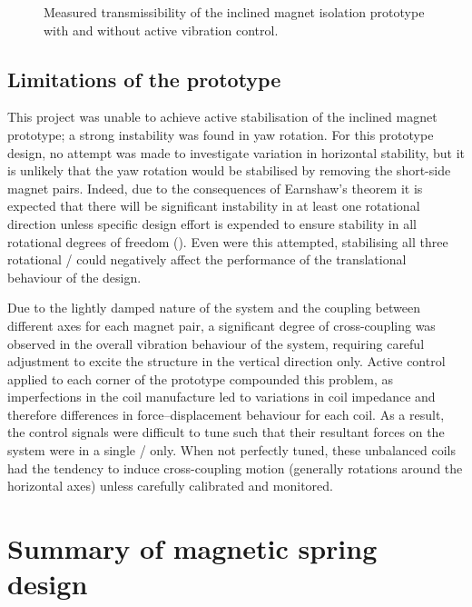 \documentclass[11pt,a4paper]{memoir}
\begin{document}
\begin{figure}
\caption{Measured transmissibility of the inclined magnet isolation prototype with and without active vibration control.}
\end{figure}

\subsection{Limitations of the prototype}

This project was unable to achieve active stabilisation of the inclined magnet prototype; a strong instability was found in yaw rotation.
For this prototype design, no attempt was made to investigate variation in horizontal stability, but it is unlikely that the yaw rotation would be stabilised by removing the short-side magnet pairs.
Indeed, due to the consequences of Earnshaw's theorem it is expected that there will be significant instability in at least one rotational direction unless specific design effort is expended to ensure stability in all rotational degrees of freedom ().
Even were this attempted, stabilising all three rotational \dofs/ could negatively affect the performance of the translational behaviour of the design.

Due to the lightly damped nature of the system and the coupling between different axes for each magnet pair, a significant degree of cross-coupling was observed in the overall vibration behaviour of the system, requiring careful adjustment to excite the structure in the vertical direction only.
Active control applied to each corner of the prototype compounded this problem, as imperfections in the coil manufacture led to variations in coil impedance and therefore differences in force--displacement behaviour for each coil.
As a result, the control signals were difficult to tune such that their resultant forces on the system were in a single \dof/ only.
When not perfectly tuned, these unbalanced coils had the tendency to induce cross-coupling motion (generally rotations around the horizontal axes) unless carefully calibrated and monitored.

\section{Summary of magnetic spring design}
\end{document}
